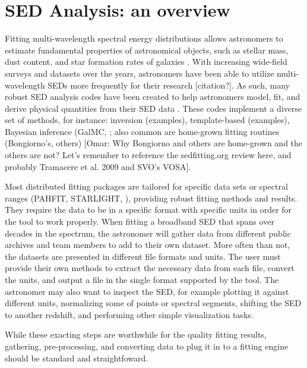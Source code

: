 \section{SED Analysis: an overview}
\label{sec:overview}

Fitting multi-wavelength spectral energy distributions allows astronomers to estimate fundamental properties of astronomical objects, such as stellar mass, dust content, and star formation rates of galaxies \cite{1998AJ....115.1329S,2001ApJS..137..139S,2007ApJS..169..328R}. With increasing wide-field surveys and datasets over the years, astronomers have been able to utilize multi-wavelength SEDs more frequently for their research [citation?]. As such, many robust SED analysis codes have been created to help astronomers model, fit, and derive physical quantities from their SED data \cite{2011Ap&SS.331....1W,2013ARA&A..51..393C}. These codes implement a diverse set of methods, for instance: inversion (examples), template-based (examples), Bayesian inference (GalMC, ; also common are home-grown fitting routines (Bongiorno's, others) [Omar: Why Bongiorno and others are home-grown and the others are not? Let's remember to reference the sedfitting.org review here, and probably Tramacere et al. 2009 and SVO's VOSA]. 

Most distributed fitting packages are tailored for specific data sets or spectral ranges (PAHFIT, STARLIGHT, ), providing robust fitting methods and results. They require the data to be in a specific format with specific units in order for the tool to work properly. When fitting a broadband SED that spans over decades in the spectrum, the astronomer will gather data from different public archives and team members to add to their own dataset. More often than not, the datasets are presented in different file formats and units. The user must provide their own methods to extract the necessary data from each file, convert the units, and output a file in the single format supported by the tool. The astronomer may also want to inspect the SED, for example plotting it against different units, normalizing some of points or spectral segments, shifting the SED to another redshift, and performing other simple visualization tasks.

While these exacting steps are worthwhile for the quality fitting results, gathering, pre-processing, and converting data to plug it in to a fitting engine should be standard and straightfoward.

